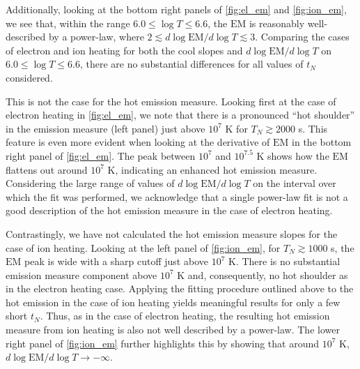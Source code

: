 \documentclass[apj]{emulateapj}
\begin{document}
	\par Additionally, looking at the bottom right panels of \autoref{fig:el_em} and \autoref{fig:ion_em}, we see that, within the range $6.0\le\log{T}\le6.6$, the $\mathrm{EM}$ is reasonably well-described by a power-law, where $2\lesssim d\log{\mathrm{EM}/d\log{T}}\lesssim3$. Comparing the cases of electron and ion heating for both the cool slopes and $d\log{\mathrm{EM}/d\log{T}}$ on $6.0\le\log{T}\le6.6$, there are no substantial differences for all values of $t_N$ considered.
	\par This is not the case for the hot emission measure. Looking first at the case of electron heating in \autoref{fig:el_em}, we note that there is a pronounced ``hot shoulder'' in the emission measure (left panel) just above $10^7$ K for $T_N\gtrsim2000$ s. This feature is even more evident when looking at the derivative of $\mathrm{EM}$ in the bottom right panel of \autoref{fig:el_em}. The peak between $10^7$ and $10^{7.5}$ K shows how the $\mathrm{EM}$ flattens out around $10^7$ K, indicating an enhanced hot emission measure. Considering the large range of values of $d\log{\mathrm{EM}}/d\log{T}$ on the interval over which the fit was performed, we acknowledge that a single power-law fit is not a good description of the hot emission measure in the case of electron heating.
	\par Contrastingly, we have not calculated the hot emission measure slopes for the case of ion heating. Looking at the left panel of \autoref{fig:ion_em}, for $T_N\gtrsim1000$ s, the $\mathrm{EM}$ peak is wide with a sharp cutoff just above $10^7$ K. There is no substantial emission measure component above $10^7$ K and, consequently, no hot shoulder as in the electron heating case. Applying the fitting procedure outlined above to the hot emission in the case of ion heating yields meaningful results for only a few short $t_N$. Thus, as in the case of electron heating, the resulting hot emission measure from ion heating is also not well described by a power-law. The lower right panel of \autoref{fig:ion_em} further highlights this by showing that around $10^7$ K, $d\log{\mathrm{EM}}/d\log{T}\to-\infty$.
\end{document}
